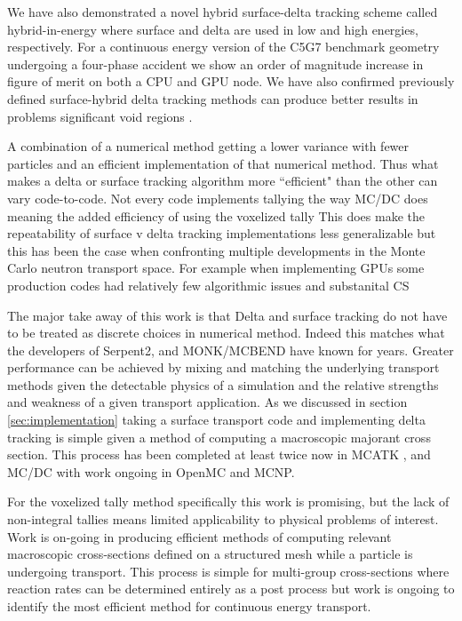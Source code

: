 We have also demonstrated a novel hybrid surface-delta tracking scheme called hybrid-in-energy where surface and delta are used in low and high energies, respectively.
For a continuous energy version of the C5G7 benchmark geometry undergoing a four-phase accident we show an order of magnitude increase in figure of merit on both a CPU and GPU node.
We have also confirmed previously defined surface-hybrid delta tracking methods can produce better results in problems significant void regions \cite{leppanen_2010_burnup}.

A combination of a numerical method getting a lower variance with fewer particles and an efficient implementation of that numerical method.
Thus what makes a delta or surface tracking algorithm more ``efficient" than the other can vary code-to-code.
Not every code implements tallying the way MC/DC does meaning the added efficiency of using the voxelized tally 
This does make the repeatability of surface v delta tracking implementations less generalizable but this has been the case when confronting multiple developments in the Monte Carlo neutron transport space.
For example when implementing GPUs some production codes had relatively few algorithmic issues and substanital CS

The major take away of this work is that Delta and surface tracking do not have to be treated as discrete choices in numerical method.
Indeed this matches what the developers of Serpent2, and MONK/MCBEND have known for years.
Greater performance can be achieved by mixing and matching the underlying transport methods given the detectable physics of a simulation and the relative strengths and weakness of a given transport application.
As we discussed in section \ref{sec:implementation} taking a surface transport code and implementing delta tracking is simple given a method of computing a macroscopic majorant cross section.
This process has been completed at least twice now in MCATK \cite{morgan2023delta}, and MC/DC with work ongoing in OpenMC and MCNP. %

For the voxelized tally method specifically this work is promising, but the lack of non-integral tallies means limited applicability to physical problems of interest.
Work is on-going in producing efficient methods of computing relevant macroscopic cross-sections defined on a structured mesh while a particle is undergoing transport.
This process is simple for multi-group cross-sections where reaction rates can be determined entirely as a post process but work is ongoing to identify the most efficient method for continuous energy transport.

